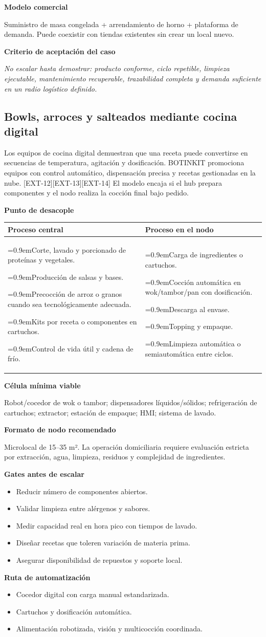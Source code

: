 \documentclass[11pt,a4paper]{article}
\makeatletter
\newcommand{\etiqueta}[1]{\par\medskip\noindent\textbf{#1}\par\nopagebreak\smallskip}
\newcommand{\ti}{\par\hangindent=0.9em\hangafter=1\noindent\makebox[0.9em][l]{\textbullet}}
\newcommand{\desacople}[2]{\etiqueta{Punto de desacople}
  {\small\noindent\begin{tabularx}{\textwidth}{@{}>{\raggedright\arraybackslash}X>{\raggedright\arraybackslash}X@{}}
  \toprule \textbf{Proceso central} & \textbf{Proceso en el nodo}\\ \midrule
  #1 & #2\\ \bottomrule\end{tabularx}}\par}
\newcommand{\rutas}[3]{\etiqueta{Ruta de automatización}
  \begin{itemize}[leftmargin=2.6em,labelwidth=2em]
  \item[\textbf{1.0}] #1
  \item[\textbf{2.0}] #2
  \item[\textbf{3.0}] #3
  \end{itemize}}
\newcommand{\criterio}{\etiqueta{Criterio de aceptación del caso}
  \noindent\textit{No escalar hasta demostrar: producto conforme, ciclo repetible, limpieza ejecutable,
  mantenimiento recuperable, trazabilidad completa y demanda suficiente en un radio logístico definido.}\par}
\makeatother
\begin{document}
\etiqueta{Modelo comercial}
Suministro de masa congelada + arrendamiento de horno + plataforma de demanda. Puede coexistir con
tiendas existentes sin crear un local nuevo.

\criterio

\subsection{Bowls, arroces y salteados mediante cocina digital}
Los equipos de cocina digital demuestran que una receta puede convertirse en secuencias de temperatura,
agitación y dosificación. BOTINKIT promociona equipos con control automático, dispensación precisa y
recetas gestionadas en la nube. [EXT-12][EXT-13][EXT-14] El modelo encaja si el hub prepara componentes y
el nodo realiza la cocción final bajo pedido.

\desacople{%
\ti Corte, lavado y porcionado de proteínas y vegetales.
\ti Producción de salsas y bases.
\ti Precocción de arroz o granos cuando sea tecnológicamente adecuada.
\ti Kits por receta o componentes en cartuchos.
\ti Control de vida útil y cadena de frío.}{%
\ti Carga de ingredientes o cartuchos.
\ti Cocción automática en wok/tambor/pan con dosificación.
\ti Descarga al envase.
\ti Topping y empaque.
\ti Limpieza automática o semiautomática entre ciclos.}

\etiqueta{Célula mínima viable}
Robot/cocedor de wok o tambor; dispensadores líquidos/sólidos; refrigeración de cartuchos; extractor;
estación de empaque; HMI; sistema de lavado.

\etiqueta{Formato de nodo recomendado}
Microlocal de 15--35 m². La operación domiciliaria requiere evaluación estricta por extracción, agua,
limpieza, residuos y complejidad de ingredientes.

\etiqueta{Gates antes de escalar}
\begin{itemize}
\item Reducir número de componentes abiertos.
\item Validar limpieza entre alérgenos y sabores.
\item Medir capacidad real en hora pico con tiempos de lavado.
\item Diseñar recetas que toleren variación de materia prima.
\item Asegurar disponibilidad de repuestos y soporte local.
\end{itemize}

\rutas{Cocedor digital con carga manual estandarizada.}
{Cartuchos y dosificación automática.}
{Alimentación robotizada, visión y multicocción coordinada.}
\end{document}
